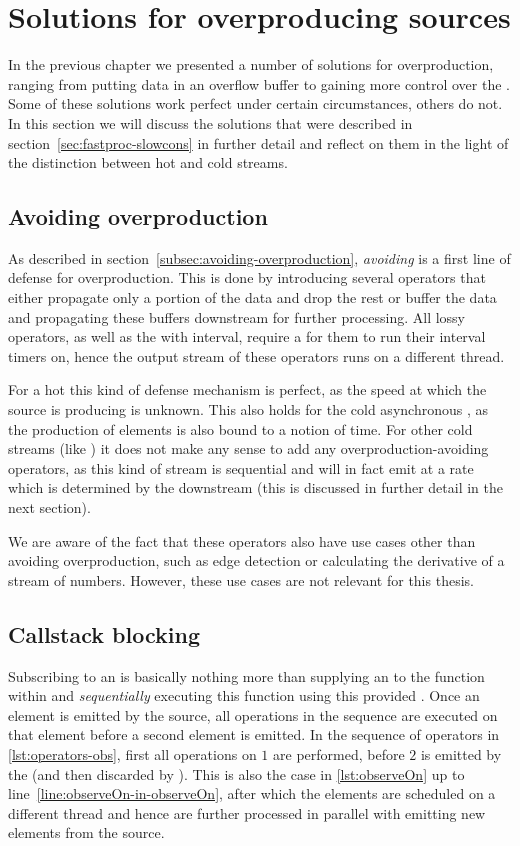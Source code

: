 \section{Solutions for overproducing sources}
In the previous chapter we presented a number of solutions for overproduction, ranging from putting data in an overflow buffer to gaining more control over the \obs. Some of these solutions work perfect under certain circumstances, others do not. In this section we will discuss the solutions that were described in section~\ref{sec:fastproc-slowcons} in further detail and reflect on them in the light of the distinction between hot and cold streams.

\subsection{Avoiding overproduction}
As described in section~\ref{subsec:avoiding-overproduction}, \textit{avoiding} is a first line of defense for overproduction. This is done by introducing several operators that either propagate only a portion of the data and drop the rest or buffer the data and propagating these buffers downstream for further processing. All lossy operators, as well as the  with interval, require a \sch for them to run their interval timers on, hence the output stream of these operators runs on a different thread.

For a hot \obs this kind of defense mechanism is perfect, as the speed at which the source is producing is unknown. This also holds for the cold asynchronous \obs, as the production of elements is also bound to a notion of time. For other cold streams (like ) it does not make any sense to add any overproduction-avoiding operators, as this kind of stream is sequential and will in fact emit at a rate which is determined by the downstream (this is discussed in further detail in the next section).

We are aware of the fact that these operators also have use cases other than avoiding overproduction, such as edge detection or calculating the derivative of a stream of numbers. However, these use cases are not relevant for this thesis.

\subsection{Callstack blocking}
Subscribing to an \obs is basically nothing more than supplying an \obv to the function within  and \emph{sequentially} executing this function using this provided \obv. Once an element is emitted by the source, all operations in the \obs sequence are executed on that element before a second element is emitted. In the sequence of operators in \autoref{lst:operators-obs}, first all operations on $1$ are performed, before $2$ is emitted by the \obs (and then discarded by ). This is also the case in \autoref{lst:observeOn} up to line~\ref{line:observeOn-in-observeOn}, after which the elements are scheduled on a different thread and hence are further processed in parallel with emitting new elements from the source.


